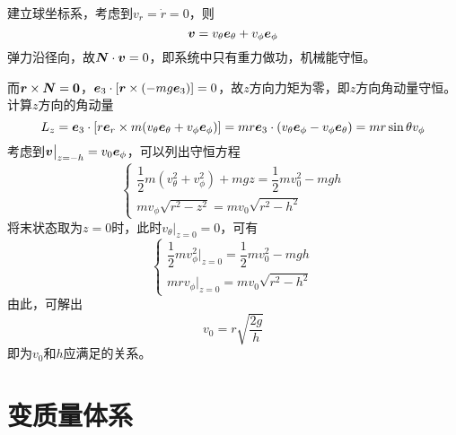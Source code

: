 \begin{solution}
建立球坐标系，考虑到$v_r = \dot{r} = 0$，则
\begin{equation*}
	\boldsymbol{v} = v_\theta \boldsymbol{e}_\theta + v_\phi \boldsymbol{e}_\phi
\end{equation*}
弹力沿径向，故$\boldsymbol{N} \cdot \boldsymbol{v} = 0$，即系统中只有重力做功，机械能守恒。

而$\boldsymbol{r} \times \boldsymbol{N} = \boldsymbol{0}$，$\boldsymbol{e}_3 \cdot \left[\boldsymbol{r} \times (-mg\boldsymbol{e}_3)\right] = 0$，故$z$方向力矩为零，即$z$方向角动量守恒。计算$z$方向的角动量
\begin{equation*}
	L_z = \boldsymbol{e}_3 \cdot \left[r\boldsymbol{e}_r \times m(v_\theta\boldsymbol{e}_\theta + v_\phi \boldsymbol{e}_\phi)\right] = mr\boldsymbol{e}_3 \cdot (v_\theta\boldsymbol{e}_\phi - v_\phi\boldsymbol{e}_\theta) = mr\sin \theta v_\phi
\end{equation*}
考虑到$\boldsymbol{v}\big|_{z=-h} = v_0 \boldsymbol{e}_\phi$，可以列出守恒方程
\begin{equation*}
	\begin{cases}
		\dfrac12 m(v_\theta^2 + v_\phi^2) + mgz = \dfrac12 mv_0^2 - mgh \\[1.5ex]
		mv_\phi \sqrt{r^2-z^2} = mv_0\sqrt{r^2-h^2}
	\end{cases}
\end{equation*}
将末状态取为$z=0$时，此时$v_\theta\big|_{z=0} = 0$，可有
\begin{equation*}
	\begin{cases}
		\dfrac12 mv_\phi^2\big|_{z=0} = \dfrac12 mv_0^2 - mgh \\
		mrv_\phi\big|_{z=0} = mv_0 \sqrt{r^2-h^2}
	\end{cases}
\end{equation*}
由此，可解出
\begin{equation*}
	v_0 = r\sqrt{\frac{2g}{h}}
\end{equation*}
即为$v_0$和$h$应满足的关系。
\end{solution}

\section{变质量体系}

